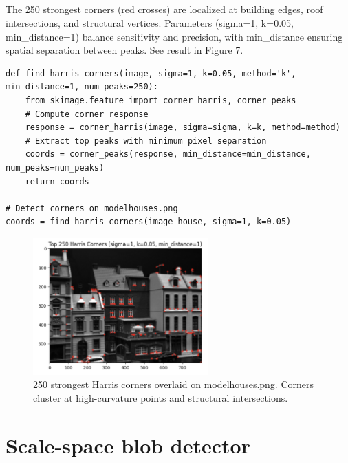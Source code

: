 \documentclass[12pt]{article}
\begin{document}
\subsection{}

The 250 strongest corners (red crosses) are localized at building edges, roof intersections, and structural vertices. Parameters (sigma=1, k=0.05, min\_distance=1) balance sensitivity and precision, with min\_distance ensuring spatial separation between peaks. See result in Figure 7.

\begin{lstlisting}
def find_harris_corners(image, sigma=1, k=0.05, method='k', min_distance=1, num_peaks=250):
    from skimage.feature import corner_harris, corner_peaks
    # Compute corner response
    response = corner_harris(image, sigma=sigma, k=k, method=method)
    # Extract top peaks with minimum pixel separation
    coords = corner_peaks(response, min_distance=min_distance, num_peaks=num_peaks)
    return coords

# Detect corners on modelhouses.png
coords = find_harris_corners(image_house, sigma=1, k=0.05)
\end{lstlisting}

\begin{figure}[h]
    \centering
    \includegraphics[width=0.6\textwidth]{pics/a5-3.3} 
    \caption{250 strongest Harris corners overlaid on modelhouses.png. Corners cluster at high-curvature points and structural intersections.}
\end{figure}

\section{Scale-space blob detector}
\end{document}
